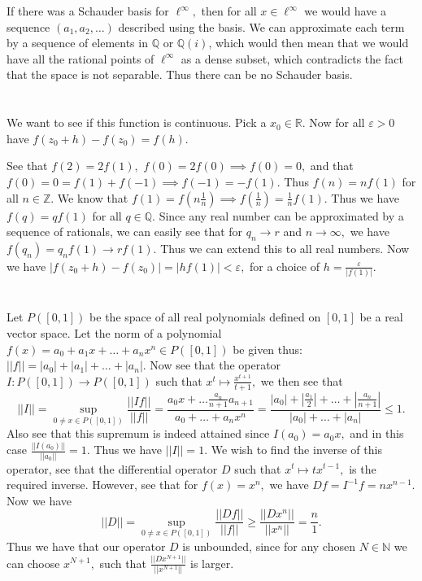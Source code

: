 \documentclass{article}
\begin{document}
If there was a Schauder basis for $\ell^{\infty},$ then for all $x \in \ell^{\infty}$  we would have a sequence $(a_1,a_2,\dots)$ described using the basis. 
We can approximate each term by a sequence of elements in $\mathbb{Q}$ or $\mathbb{Q}(i)$, which would then mean that we would have all the rational points 
of $\ell^{\infty}$ as a dense subset, which contradicts the fact that the space is not separable. Thus there can be no Schauder basis. 
\section{} %
We want to see if this function is continuous. Pick a $x_0 \in \mathbb{R}.$ Now for all $\varepsilon > 0$ have $f(z_0+h)-f(z_0)=f(h).$ 

See that $f(2)=2f(1),$ $f(0)=2f(0) \implies f(0)=0,$  and that $f(0)=0=f(1)+f(-1) \implies f(-1)=-f(1).$ Thus $f(n)=nf(1)$ for all $n \in \mathbb{Z}.$ We 
know that $f(1)=f\left(n \frac{1}{n}\right) \implies f\left(\frac{1}{n}\right)=\frac{1}{n}f(1).$ Thus we have $f(q)=qf(1)$ for all $q \in \mathbb{Q}.$ Since 
any real number can be approximated by a sequence of rationals, we can easily see that for $q_n \to r$ and $n \to \infty,$ we have $f(q_n)=q_nf(1) \to 
rf(1).$ Thus we can extend this to all real numbers. Now we have $|f(z_0+h)-f(z_0)|=|hf(1)| < \varepsilon,$ for a choice of $h= \frac{\varepsilon}{|f(1)|}.$
\section{} %
Let $P([0,1])$ be the space of all real polynomials defined on $[0,1]$ be a real vector space. Let the norm of a polynomial $f(x)=a_0+a_1x+\dots+a_nx^n \in 
P([0,1])$ be given thus: $||f|| = |a_0|+|a_1|+\dots+|a_n|.$ Now see that the operator $I:P([0,1]) \rightarrow P([0,1])$ such that $x^t \mapsto 
\frac{x^{t+1}}{t+1},$ we then see that $$||I|| = \sup_{0 \neq x \in P([0,1])} \frac{||If||}{||f||} = \frac{a_0x+\dots 
\frac{a_n}{n+1}a_{n+1}}{a_0+\dots+a_nx^n }=\frac{|a_0|+\left|\frac{a_1}{2}\right|+\dots + \left|\frac{a_n}{n+1}\right|}{|a_0|+\dots+ |a_n|} \leq 1.$$ Also 
see that this supremum is indeed attained since $I(a_0)=a_0x,$ and in this case $\frac{||I(a_0)||}{||a_0||}=1.$ Thus we have $||I|| =1.$ We wish to find the 
inverse of this operator, see that the differential operator $D$ such that $x^t \mapsto tx^{t-1},$ is the required inverse. However, see that for 
$f(x)=x^n,$ we have $Df=I^{-1}f=nx^{n-1}.$ Now we have $$||D|| = \sup_{0 \neq x \in P([0,1])} \frac{||Df||}{||f||} \geq 
\frac{||Dx^n||}{||x^n||}=\frac{n}{1}.$$ Thus we have that our operator $D$ is unbounded, since for any chosen $N \in \mathbb{N}$ we can choose $x^{N+1},$ 
such that $ \frac{||Dx^{N+1}||}{||x^{N+1}||}$ is larger. 
\end{document}

